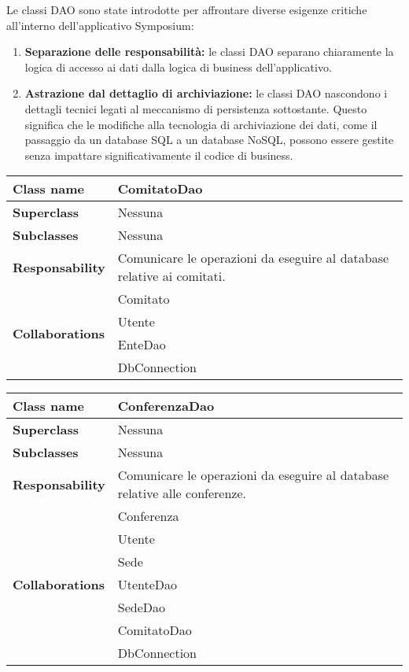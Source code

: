 Le classi DAO sono state introdotte per affrontare diverse esigenze critiche all'interno dell'applicativo Symposium:
\begin{enumerate}
	\item \textbf{Separazione delle responsabilità:} le classi DAO separano chiaramente la logica di accesso ai dati dalla logica di business dell'applicativo. 
	\item \textbf{Astrazione dal dettaglio di archiviazione:} le classi DAO nascondono i dettagli tecnici legati al meccanismo di persistenza sottostante. Questo significa che le modifiche alla tecnologia di archiviazione dei dati, come il passaggio da un database SQL a un database NoSQL, possono essere gestite senza impattare significativamente il codice di business.
\end{enumerate}
\newpage
\begin{table}[h!]
	\begin{tabular}{|l|l|}
		\hline 
		\textbf{Class name} & ComitatoDao
		\\ \hline
		\textbf{Superclass} & Nessuna
		\\ \hline
		\multirow{1}{*}{\textbf{Subclasses}} & Nessuna
		\\ \hline
		\textbf{Responsability} & Comunicare le operazioni da eseguire al database relative ai comitati.
		\\ \hline
		\multirow{4}{*}{\textbf{Collaborations}} & Comitato \\ 
		& Utente \\
		& EnteDao \\
		& DbConnection \\
	\hline
	\end{tabular}
\end{table}

\begin{table}[h!]
	\begin{tabular}{|l|l|}
		\hline 
		\textbf{Class name} & ConferenzaDao
		\\ \hline
		\textbf{Superclass} & Nessuna
		\\ \hline
		\multirow{1}{*}{\textbf{Subclasses}} & Nessuna
		\\ \hline
		\textbf{Responsability} & Comunicare le operazioni da eseguire al database relative alle conferenze.
		\\ \hline
		\multirow{7}{*}{\textbf{Collaborations}} & Conferenza \\ 
		& Utente \\
		& Sede \\
		& UtenteDao\\
		& SedeDao \\
		& ComitatoDao \\
		& DbConnection \\ \hline
	\end{tabular}
\end{table}

